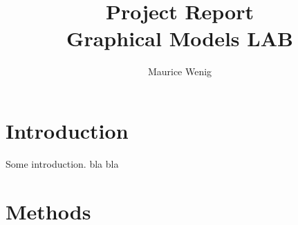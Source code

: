 \documentclass[sigconf, fleqn]{acmart}
\begin{document}
\title[Project Report]{Project Report\\\large Graphical Models LAB}


\author{Maurice Wenig}


\maketitle



\section{Introduction}
Some introduction. bla bla
\FloatBarrier


\section{Methods}
\end{document}

